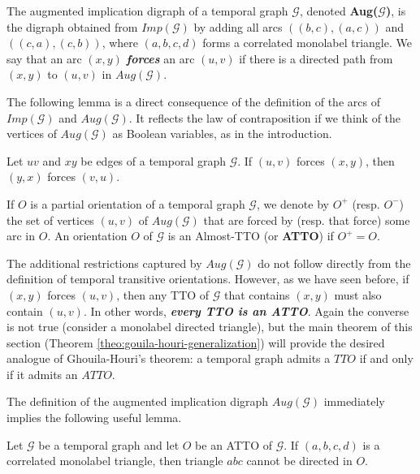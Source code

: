 \documentclass[runningheads]{llncs}
\def\mG{\mathcal{G}}
\newcommand{\bfit}[1]{\textbf{\textit{#1}}}
\begin{document}
\begin{definition}
The augmented implication digraph of a temporal graph $\mathcal{G}$, denoted \textbf{Aug($\mathcal{G}$)}, is the digraph obtained from $Imp(\mathcal{G})$ by adding all arcs $((b,c),(a,c))$ and $((c,a),(c,b))$, where $(a,b,c,d)$ forms a correlated monolabel triangle. We say that an arc $(x,y)$ \bfit{forces} an arc $(u,v)$ if there is a directed path from $(x,y)$ to $(u,v)$ in $Aug(\mathcal{G})$.
\end{definition}


The following lemma is a direct consequence of the definition of the arcs of $Imp(\mG)$ and $Aug(\mG)$. It reflects the law of contraposition if we think of the vertices of $Aug(\mG)$ as Boolean variables, as in the introduction.

\begin{lemma}\label{lem:contrapos}
Let  $uv$ and $xy$ be edges of a temporal graph $\mG$. If $(u,v)$ forces $(x,y)$, then $(y,x)$ forces $(v,u)$.
\end{lemma}

\begin{definition}
If $O$ is a partial orientation of a temporal graph $\mathcal{G}$, we denote by $O^+$ (resp. $O^-$) the set of vertices $(u,v)$ of $Aug(\mathcal{G})$ that are forced by (resp. that force) some arc in $O$. An orientation $O$ of $\mG$ is an Almost-TTO (or \textbf{ATTO})  if $O^+=O$.
\end{definition}

The additional restrictions captured by $Aug(\mathcal{G})$ do not follow directly from the definition of temporal transitive orientations. However, as we have seen before, if $(x,y)$ forces $(u,v)$, then any TTO of $\mathcal{G}$ that contains $(x,y)$ must also contain $(u,v)$. In other words, \bfit{every TTO is an ATTO}. Again the converse is not true (consider a monolabel directed triangle), but the main theorem of this section (Theorem \ref{theo:gouila-houri-generalization}) will provide the desired analogue of Ghouila-Houri's theorem: a temporal graph admits a $TTO$ if and only if it admits an $ATTO$.

The definition of the augmented implication digraph $Aug(\mathcal{G})$ immediately implies the following useful lemma.

\begin{lemma}
Let $\mathcal{G}$ be a temporal graph and let $O$ be an ATTO of $\mathcal{G}$. If $(a,b,c,d)$ is a correlated monolabel triangle, then triangle $abc$ cannot be directed in $O$.
\label{lem:non-dir-corr-triangle}
\end{lemma}
\end{document}
